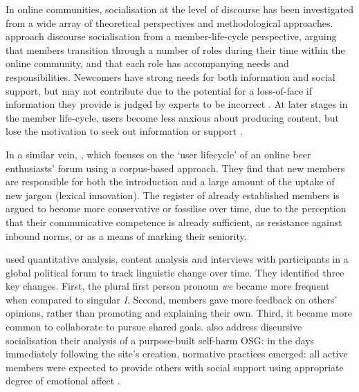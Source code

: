 		 In online communities, socialisation at the level of discourse has been investigated from a wide array of theoretical perspectives and methodological approaches. \textcite{lee_new_2014} approach discourse socialisation from a member-life-cycle perspective, arguing that members transition through a number of roles during their time within the online community, and that each role has accompanying needs and responsibilities. Newcomers have strong needs for both information and social support, but may not contribute due to the potential for a loss-of-face if information they provide is judged by experts to be incorrect \cite{fuller_innovation_2007}. At later stages in the member life-cycle, users become less anxious about producing content, but lose the motivation to seek out information or support \textcite{lee_new_2014}. %

		 In a similar vein, \textcite{danescu-niculescu-mizil_no_2013}, which focuses on the `user lifecycle' of an online beer enthusiasts' forum using a corpus-based approach. They find that new members are responsible for both the introduction and a large amount of the uptake of new jargon (lexical innovation). The register of already established members is argued to become more conservative or fossilise over time, due to the perception that their communicative competence is already sufficient, as resistance against inbound norms, or as a means of marking their seniority.

		 \textcite{cassell_language_2005} used quantitative analysis, content analysis and interviews with participants in a global political forum to track linguistic change over time. They identified three key changes. First, the plural first person pronoun \emph{we} became more frequent when compared to singular \emph{I}. Second, members gave more feedback on others' opinions, rather than promoting and explaining their own. Third, it became more common to collaborate to pursue shared goals. \textcite{smithson_membership_2011} also address discursive socialisation their analysis of a purpose-built self-harm OSG: in the days immediately following the site's creation, normative practices emerged: all active members were expected to provide others with social support using appropriate degree of emotional affect \cite{smithson_problem_2011}. 

